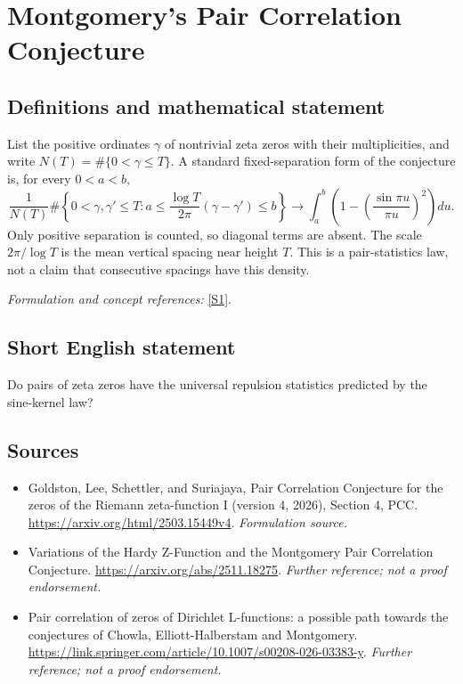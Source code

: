 \documentclass[11pt]{article}
\begin{document}
\section*{\texorpdfstring{Montgomery's Pair Correlation Conjecture}{Montgomery's Pair Correlation Conjecture}}\label{statement}
\subsection{Definitions and mathematical statement}
List the positive ordinates $\gamma$ of nontrivial zeta zeros with their multiplicities, and write $N(T)=\#\{0<\gamma\le T\}$. A standard fixed-separation form of the conjecture is, for every $0<a<b$,
\[
 \frac{1}{N(T)}\#\left\{0<\gamma,\gamma'\le T:
 a\le\frac{\log T}{2\pi}(\gamma-\gamma')\le b\right\}
 \longrightarrow\int_a^b\left(1-\left(\frac{\sin\pi u}{\pi u}\right)^2\right)du.
\]
Only positive separation is counted, so diagonal terms are absent. The scale $2\pi/\log T$ is the mean vertical spacing near height $T$. This is a pair-statistics law, not a claim that consecutive spacings have this density.
\par\smallskip\textit{Formulation and concept references:} \href{https://arxiv.org/html/2503.15449v4}{[S1]}.

\subsection{Short English statement}
Do pairs of zeta zeros have the universal repulsion statistics predicted by the sine-kernel law?
\subsection{Sources}
\begin{itemize}
\item[S1]Goldston, Lee, Schettler, and Suriajaya, Pair Correlation Conjecture for the zeros of the Riemann zeta-function I (version 4, 2026), Section 4, PCC.
\url{https://arxiv.org/html/2503.15449v4}.
\textit{Formulation source.}
\item[S2]Variations of the Hardy Z-Function and the Montgomery Pair Correlation Conjecture.
\url{https://arxiv.org/abs/2511.18275}.
\textit{Further reference; not a proof endorsement.}
\item[S3]Pair correlation of zeros of Dirichlet L-functions: a possible path towards the conjectures of Chowla, Elliott-Halberstam and Montgomery.
\url{https://link.springer.com/article/10.1007/s00208-026-03383-y}.
\textit{Further reference; not a proof endorsement.}
\end{itemize}
\end{document}
